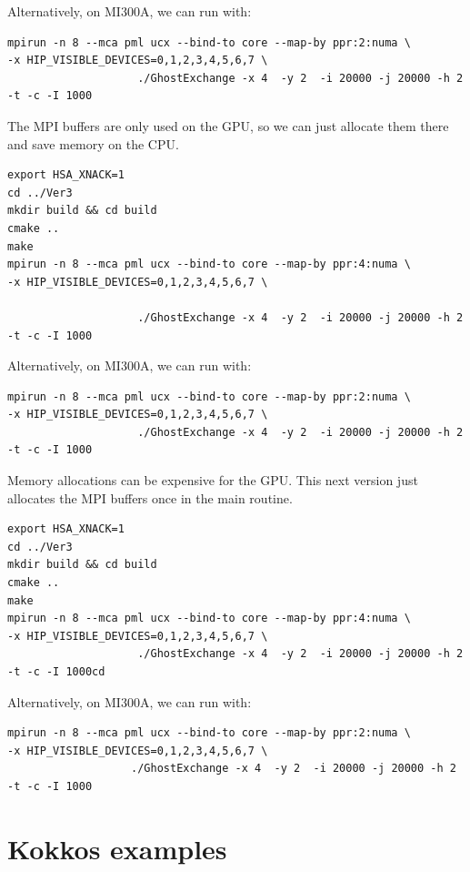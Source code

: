 \documentclass[
]{article}
\begin{document}
Alternatively, on MI300A, we can run with:

\begin{verbatim}
mpirun -n 8 --mca pml ucx --bind-to core --map-by ppr:2:numa \
-x HIP_VISIBLE_DEVICES=0,1,2,3,4,5,6,7 \
                    ./GhostExchange -x 4  -y 2  -i 20000 -j 20000 -h 2 -t -c -I 1000
\end{verbatim}

The MPI buffers are only used on the GPU, so we can just allocate them
there and save memory on the CPU.

\begin{verbatim}
export HSA_XNACK=1
cd ../Ver3
mkdir build && cd build
cmake ..
make
mpirun -n 8 --mca pml ucx --bind-to core --map-by ppr:4:numa \
-x HIP_VISIBLE_DEVICES=0,1,2,3,4,5,6,7 \ 

                    ./GhostExchange -x 4  -y 2  -i 20000 -j 20000 -h 2 -t -c -I 1000
\end{verbatim}

Alternatively, on MI300A, we can run with:

\begin{verbatim}
mpirun -n 8 --mca pml ucx --bind-to core --map-by ppr:2:numa \
-x HIP_VISIBLE_DEVICES=0,1,2,3,4,5,6,7 \
                    ./GhostExchange -x 4  -y 2  -i 20000 -j 20000 -h 2 -t -c -I 1000
\end{verbatim}

Memory allocations can be expensive for the GPU. This next version just
allocates the MPI buffers once in the main routine.

\begin{verbatim}
export HSA_XNACK=1
cd ../Ver3
mkdir build && cd build
cmake ..
make
mpirun -n 8 --mca pml ucx --bind-to core --map-by ppr:4:numa \
-x HIP_VISIBLE_DEVICES=0,1,2,3,4,5,6,7 \
                    ./GhostExchange -x 4  -y 2  -i 20000 -j 20000 -h 2 -t -c -I 1000cd
\end{verbatim}

Alternatively, on MI300A, we can run with:

\begin{verbatim}
mpirun -n 8 --mca pml ucx --bind-to core --map-by ppr:2:numa \
-x HIP_VISIBLE_DEVICES=0,1,2,3,4,5,6,7 \
                   ./GhostExchange -x 4  -y 2  -i 20000 -j 20000 -h 2 -t -c -I 1000
\end{verbatim}


\pagebreak

\hypertarget{kokkos-examples}{%
\section{Kokkos examples}\label{kokkos-examples}}
\end{document}
